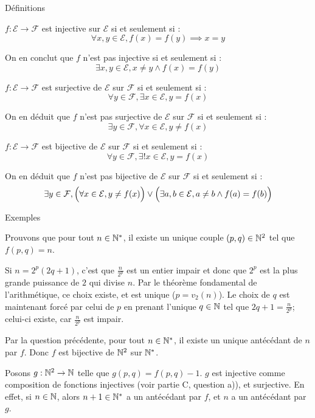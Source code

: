 \documentclass[]{../templates/homework}
\begin{document}
\newcommand{\E}{\mathcal E}
\newcommand{\F}{\mathcal F}
\newcommand{\G}{\mathcal G}

 {Définitions}
\subproblem

$f: \E \rightarrow \F$ est injective sur $\E$ si et seulement si :
$$\forall x,y \in \E, f(x) = f(y) \implies x = y$$

On en conclut que $f$ n'est pas injective si et seulement si :
$$\exists x,y \in \E, x \neq y \land f(x) = f(y)$$

\subproblem
$f: \E \rightarrow \F$ est surjective de $\E$ sur $\F$ si et seulement si :
$$\forall y \in \F, \exists x \in \E, y = f(x)$$

On en déduit que $f$ n'est pas surjective de $\E$ sur $\F$ si et seulement si :
$$\exists y \in \F, \forall x\in\E, y \neq f(x)$$

\subproblem
$f: \E \rightarrow \F$ est bijective de $\E$ sur $\F$ si et seulement si :
$$\forall y \in \F, \exists ! x \in \E, y = f(x)$$

On en déduit que $f$ n'est pas bijective de $\E$ sur $\F$ si et seulement si :
$$\exists y \in \F,\Bigl(\forall x\in\E, y \neq f(x)\Bigr) \lor \Bigl(\exists a,b\in\E, a\neq b \land f(a) = f(b)\Bigr)$$

 {Exemples}
\setcounter{subproblem}{0}
\subproblem

\newpage
\vspace{5cm}

\subproblem

\vspace{12cm}

\subproblem
\question Prouvons que pour tout $n\in\mathbb N^{*}$, il existe un unique couple $(p,q) \in \mathbb N^{2}$ tel que $f(p,q)= n$.

Si $n=2^{p}(2q+1)$, c'est que $\frac {n} {2^{p}}$ est un entier impair et donc que $2^{p}$ est la plus grande puissance de $2$ qui divise $n$. Par le théorème fondamental de l'arithmétique, ce choix existe, et est unique ($p = v_{2}(n)$). Le choix de $q$ est maintenant forcé par celui de $p$ en prenant l'unique $q\in\mathbb N$ tel que $2q+1 = \frac n {2^{p}}$; celui-ci existe, car $\frac n {2^{p}}$ est impair.

\question Par la question précédente, pour tout $n\in\mathbb N^{*}$, il existe un unique antécédant de $n$ par $f$. Donc $f$ est bijective de $\mathbb N^{2}$ sur $\mathbb N^{*}$.

\question Posons $g: \mathbb N^{2} \rightarrow \mathbb N$ telle que $g(p,q) = f(p,q)-1$. $g$ est injective comme composition de fonctions injectives (voir partie C, question a)), et surjective. En effet, si $n\in\mathbb N$, alors $n+1 \in \mathbb N^{*}$ a un antécédant par $f$, et $n$ a un antécédant par $g$.
\end{document}
